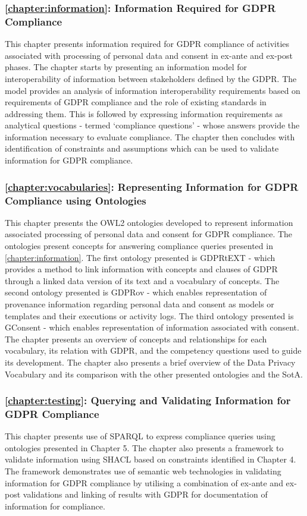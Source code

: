 \subsubsection*{\autoref{chapter:information}: Information Required for GDPR Compliance}
This chapter presents information required for GDPR compliance of activities associated with processing of personal data and consent in ex-ante and ex-post phases.
The chapter starts by presenting an information model for interoperability of information between stakeholders defined by the GDPR.
The model provides an analysis of information interoperability requirements based on requirements of GDPR compliance and the role of existing standards in addressing them.
This is followed by expressing information requirements as analytical questions - termed `compliance questions' - whose answers provide the information necessary to evaluate compliance. 
The chapter then concludes with identification of constraints and assumptions which can be used to validate information for GDPR compliance.

\subsubsection*{\autoref{chapter:vocabularies}: Representing Information for GDPR Compliance using Ontologies}
This chapter presents the OWL2 ontologies developed to represent information associated processing of personal data and consent for GDPR compliance.
The ontologies present concepts for answering compliance queries presented in \autoref{chapter:information}. The first ontology presented is GDPRtEXT - which provides a method to link information with concepts and clauses of GDPR through a linked data version of its text and a vocabulary of concepts. The second ontology presented is GDPRov - which enables representation of provenance information regarding personal data and consent as models or templates and their executions or activity logs. The third ontology presented is GConsent - which enables representation of information associated with consent. The chapter presents an overview of concepts and relationships for each vocabulary, its relation with GDPR, and the competency questions used to guide its development. The chapter also presents a brief overview of the Data Privacy Vocabulary and its comparison with the other presented ontologies and the SotA.

\subsubsection*{\autoref{chapter:testing}: Querying and Validating Information for GDPR Compliance}
This chapter presents use of SPARQL to express compliance queries using ontologies presented in Chapter 5. The chapter also presents a framework to validate information using SHACL based on constraints identified in Chapter 4. The framework demonstrates use of semantic web technologies in validating information for GDPR compliance by utilising a combination of ex-ante and ex-post validations and linking of results with GDPR for documentation of information for compliance.

